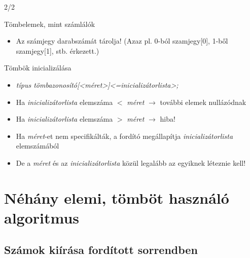 \documentclass[usenames,dvipsnames,aspectratio=169]{beamer}
\begin{document}
\begin{frame}
  \begin{exampleblock}{ 2/2}
    \scriptsize
    
  \end{exampleblock}
\end{frame}

\begin{frame}
  Tömbelemek, mint számlálók
  \begin{itemize}
    \item[] Az  számjegy darabszámát  tárolja! (Azaz pl. 0-ból szamjegy[0], 1-ből szamjegy[1], stb. érkezett.)
  \end{itemize}
  \vfill
  Tömbök inicializálása
  \begin{itemize}
    \item \emph{típus tömbazonosító[<méret>]<={inicializátorlista}>;}
    \item Ha \emph{inicializátorlista} elemszáma $<$ \emph{méret} $\to$ további elemek nullázódnak
    \item Ha \emph{inicializátorlista} elemszáma $>$ \emph{méret} $\to$ hiba!
    \item Ha \emph{méret}-et nem specifikálták, a fordító megállapítja \emph{inicializátorlista} elemszámából
    \item De a \emph{méret} és az \emph{inicializátorlista} közül legalább az egyiknek léteznie kell!
  \end{itemize}
\end{frame}

\begin{frame}
  \begin{exampleblock}{}
    \tiny
    \vspace{-.2cm}
    
    \vspace{-.2cm}
  \end{exampleblock}
\end{frame}

\section{Néhány elemi, tömböt használó algoritmus}
\subsection{Számok kiírása fordított sorrendben}
\begin{frame}
  \begin{exampleblock}{}
    
  \end{exampleblock}
\end{frame}
\end{document}
